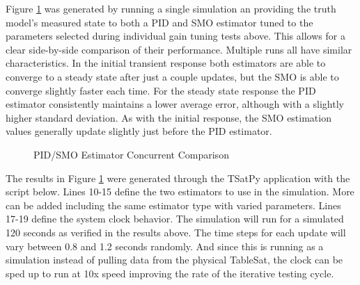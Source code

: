 Figure \ref{fig:PIDSMOEstimatorConcurrentComparison} was generated by running a single simulation an providing the truth model's measured state to both a PID and SMO estimator tuned to the parameters selected during individual gain tuning tests above.  This allows for a clear side-by-side comparison of their performance.  Multiple runs all have similar characteristics.  In the initial transient response both estimators are able to converge to a steady state after just a couple updates, but the SMO is able to converge slightly faster each time.  For the steady state response the PID estimator consistently maintains a lower average error, although with a slightly higher standard deviation.  As with the initial response, the SMO estimation values generally update slightly just before the PID estimator.

\begin{figure}[H]
  \centerline{}
  \caption{PID/SMO Estimator Concurrent Comparison}
  \label{fig:PIDSMOEstimatorConcurrentComparison}
\end{figure}

The results in Figure \ref{fig:PIDSMOEstimatorConcurrentComparison} were generated through the TSatPy application with the script below.  Lines 10-15 define the two estimators to use in the simulation.  More can be added including the same estimator type with varied parameters.  Lines 17-19 define the system clock behavior.  The simulation will run for a simulated 120 seconds as verified in the results above.  The time steps for each update will vary between 0.8 and 1.2 seconds randomly.  And since this is running as a simulation instead of pulling data from the physical TableSat, the clock can be sped up to run at 10x speed improving the rate of the iterative testing cycle.

